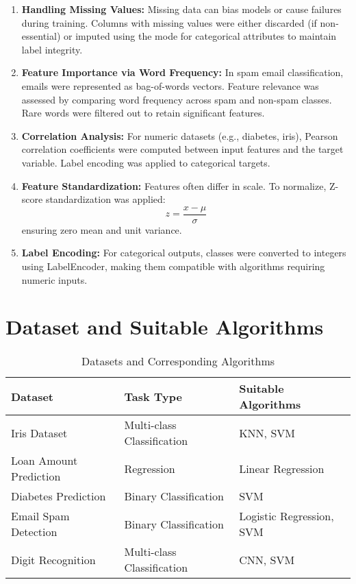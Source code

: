 \documentclass[12pt]{article}
\begin{document}
\begin{enumerate}
    \item \textbf{Handling Missing Values:} Missing data can bias models or cause failures during training. Columns with missing values were either discarded (if non-essential) or imputed using the mode for categorical attributes to maintain label integrity.
    
    \item \textbf{Feature Importance via Word Frequency:} In spam email classification, emails were represented as bag-of-words vectors. Feature relevance was assessed by comparing word frequency across spam and non-spam classes. Rare words were filtered out to retain significant features.
    
    \item \textbf{Correlation Analysis:} For numeric datasets (e.g., diabetes, iris), Pearson correlation coefficients were computed between input features and the target variable. Label encoding was applied to categorical targets.
    
    \item \textbf{Feature Standardization:} Features often differ in scale. To normalize, Z-score standardization was applied:
    \[ z = \frac{x - \mu}{\sigma} \]
    ensuring zero mean and unit variance.
    
    \item \textbf{Label Encoding:} For categorical outputs, classes were converted to integers using LabelEncoder, making them compatible with algorithms requiring numeric inputs.
\end{enumerate}

\section{Dataset and Suitable Algorithms}

\begin{table}[h]
\centering
\caption{Datasets and Corresponding Algorithms}
\begin{tabular}{|l|l|l|}
\hline
\textbf{Dataset} & \textbf{Task Type} & \textbf{Suitable Algorithms} \\ \hline
Iris Dataset & Multi-class Classification & KNN, SVM \\ \hline
Loan Amount Prediction & Regression & Linear Regression \\ \hline
Diabetes Prediction & Binary Classification & SVM \\ \hline
Email Spam Detection & Binary Classification & Logistic Regression, SVM \\ \hline
Digit Recognition & Multi-class Classification & CNN, SVM \\ \hline
\end{tabular}
\label{tab:datasets}
\end{table}
\end{document}
